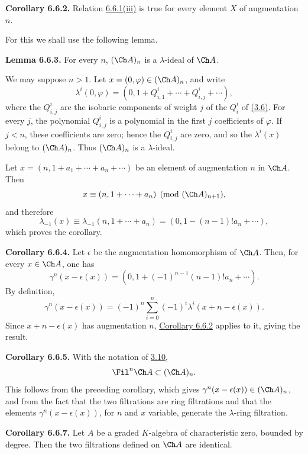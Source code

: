 \textbf{Corollary 6.6.2.} Relation \hyperlink{sga6.e05.prop.6-6-1}{6.6.1(iii)} is true for every element \(X\) of augmentation \(n\).

For this we shall use the following lemma.

\textbf{Lemma 6.6.3.} For every \(n\), \((\Ch A)_n\) is a \(\lambda\)-ideal of \(\Ch A\).

We may suppose \(n>1\). Let \(x=(0,\varphi)\in(\Ch A)_n\), and write
\[
  \lambda^i(0,\varphi)=(0,1+Q^i_{i,1}+\cdots+Q^i_{i,j}+\cdots),
\]
where the \(Q^i_{i,j}\) are the isobaric components of weight \(j\) of the \(Q^i_i\) of \hyperlink{sga6.e05.para.3-6}{(3.6)}. For every \(j\), the polynomial \(Q^i_{i,j}\) is a polynomial in the first \(j\) coefficients of \(\varphi\). If \(j<n\), these coefficients are zero; hence the \(Q^i_{i,j}\) are zero, and so the \(\lambda^i(x)\) belong to \((\Ch A)_n\). Thus \((\Ch A)_n\) is a \(\lambda\)-ideal.

Let \(x=(n,1+a_1+\cdots+a_n+\cdots)\) be an element of augmentation \(n\) in \(\Ch A\). Then
\[
  x\equiv (n,1+\cdots+a_n)\pmod{(\Ch A)_{n+1}},
\]
and therefore
\[
  \lambda_{-1}(x)\equiv \lambda_{-1}(n,1+\cdots+a_n)
  =(0,1-(n-1)!a_n+\cdots),
\]
which proves the corollary.

\textbf{Corollary 6.6.4.} Let \(\epsilon\) be the augmentation homomorphism of \(\Ch A\). Then, for every \(x\in\Ch A\), one has
\[
  \gamma^n(x-\epsilon(x))
  =
  (0,1+(-1)^{n-1}(n-1)!a_n+\cdots).
\]
By definition,
\[
  \gamma^n(x-\epsilon(x))
  =
  (-1)^n\sum_{i=0}^n(-1)^i\lambda^i(x+n-\epsilon(x)).
\]
Since \(x+n-\epsilon(x)\) has augmentation \(n\), \hyperlink{sga6.e05.cor.6-6-2}{Corollary 6.6.2} applies to it, giving the result.

\textbf{Corollary 6.6.5.} With the notation of \hyperlink{sga6.e05.para.3-10}{3.10},
\[
  \Fil^n\Ch A\subset(\Ch A)_n.
\]
This follows from the preceding corollary, which gives \(\gamma^n(x-\epsilon(x))\in(\Ch A)_n\), and from the fact that the two filtrations are ring filtrations and that the elements \(\gamma^n(x-\epsilon(x))\), for \(n\) and \(x\) variable, generate the \(\lambda\)-ring filtration.

\textbf{Corollary 6.6.7.} Let \(A\) be a graded \(K\)-algebra of characteristic zero, bounded by degree. Then the two filtrations defined on \(\Ch A\) are identical.

